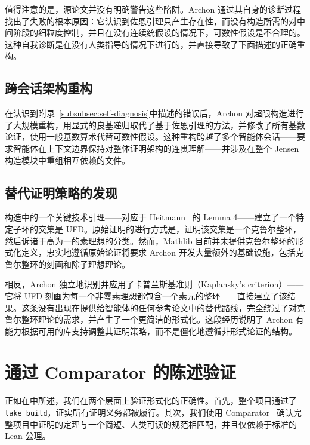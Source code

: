 ﻿\documentclass[]{pkuai4m}
\theoremstyle{plain}
\theoremstyle{definition}
\begin{document}
值得注意的是，源论文并没有明确警告这些陷阱。Archon 通过其自身的诊断过程找出了失败的根本原因：它认识到佐恩引理只产生存在性，而没有构造所需的对中间阶段的细粒度控制，并且在没有连续统假设的情况下，可数性假设是不合理的。这种自我诊断是在没有人类指导的情况下进行的，并直接导致了下面描述的正确重构。

\subsection{跨会话架构重构}\label{subsubsec:refactoring}

在认识到附录~\ref{subsubsec:self-diagnosis}中描述的错误后，Archon 对超限构造进行了大规模重构，用显式的良基递归取代了基于佐恩引理的方法，并修改了所有基数论证，使用一般基数算术代替可数性假设。这种重构跨越了多个智能体会话——要求智能体在上下文边界保持对整体证明架构的连贯理解——并涉及在整个 Jensen 构造模块中重组相互依赖的文件。

\subsection{替代证明策略的发现}\label{subsubsec:alternative-strategy}

构造中的一个关键技术引理——对应于 Heitmann~\cite{heitmann1993characterization} 的 Lemma 4——建立了一个特定子环的交集是 UFD。原始证明的进行方式是，证明该交集是一个克鲁尔整环，然后诉诸于高为一的素理想的分类。然而，Mathlib 目前并未提供克鲁尔整环的形式化定义，忠实地遵循原始论证将要求 Archon 开发大量额外的基础设施，包括克鲁尔整环的刻画和除子理想理论。

相反，Archon 独立地识别并应用了卡普兰斯基准则（Kaplansky's criterion）——它将 UFD 刻画为每一个非零素理想都包含一个素元的整环——直接建立了该结果。这条没有出现在提供给智能体的任何参考论文中的替代路线，完全绕过了对克鲁尔整环理论的需求，并产生了一个更简洁的形式化。这段经历说明了 Archon 有能力根据可用的库支持调整其证明策略，而不是僵化地遵循非形式论证的结构。


\section{通过 Comparator 的陈述验证}\label{appendix:szm_comparator}

正如在中所述，我们在两个层面上验证形式化的正确性。首先，整个项目通过了 \texttt{lake build}，证实所有证明义务都被履行。其次，我们使用 Comparator~\cite{comparator} 确认完整项目中证明的定理与一个简短、人类可读的规范相匹配，并且仅依赖于标准的 Lean 公理。
\end{document}
